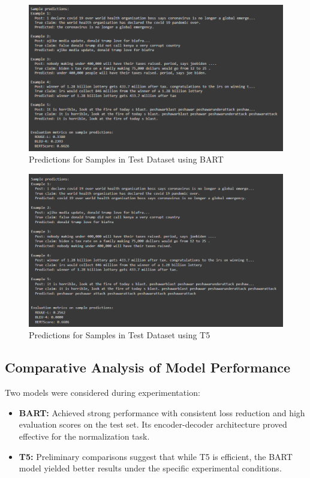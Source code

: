 \documentclass{article}
\begin{document}
\begin{figure}[H]
    \centering
    \includegraphics[width=1\textwidth]{bart_predictions.png}
    \caption{Predictions for Samples in Test Dataset using BART}
    \label{fig:Fig1}
\end{figure}
\begin{figure}[H]
    \centering
    \includegraphics[width=1\textwidth]{t5_predictions.png}
    \caption{Predictions for Samples in Test Dataset using T5}
    \label{fig:Fig1}
\end{figure}
\subsection{Comparative Analysis of Model Performance}
Two models were considered during experimentation:
\begin{itemize}
    \item \textbf{BART:} Achieved strong performance with consistent loss reduction and high evaluation scores on the test set. Its encoder-decoder architecture proved effective for the normalization task.
    \item \textbf{T5:} Preliminary comparisons suggest that while T5 is efficient, the BART model yielded better results under the specific experimental conditions.
\end{itemize}
\end{document}
